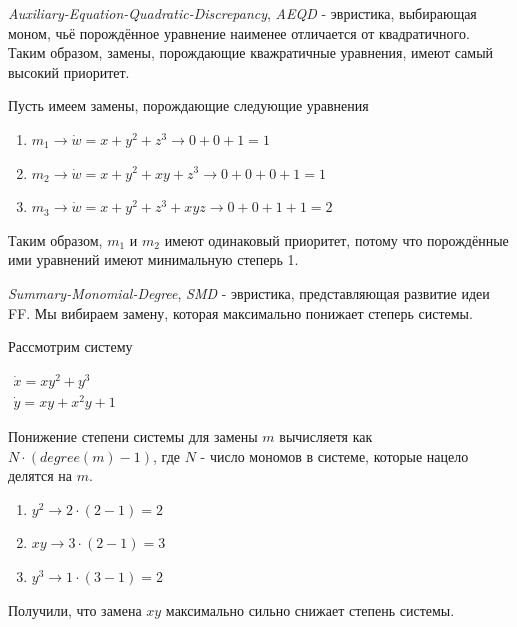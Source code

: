 \begin{heuristics} \label{AEQD}
    \textit{Auxiliary-Equation-Quadratic-Discrepancy}, \textit{AEQD} - эвристика, выбирающая моном, чьё порождённое уравнение наименее отличается от квадратичного. Таким образом, замены, порождающие кважратичные уравнения, имеют самый высокий приоритет. 
    
    \begin{example}
        Пусть имеем замены, порождающие следующие уравнения
        \begin{enumerate}
            \item $m_1 \longrightarrow \dot w = x + y^2 + z^3 \longrightarrow 0 + 0 + 1 = 1$
            \item $m_2 \longrightarrow \dot w = x + y^2 + xy + z^3 \longrightarrow 0 + 0 + 0 + 1 = 1$
            \item $m_3 \longrightarrow \dot w = x + y^2 + z^3 + xyz \longrightarrow 0 + 0 +1 + 1 = 2$
        \end{enumerate}
        Таким образом, $m_1$ и $m_2$ имеют одинаковый приоритет, потому что порождённые ими уравнений имеют минимальную степерь 1.
    \end{example}
\end{heuristics}

\begin{heuristics} \label{AEQD}
    \textit{Summary-Monomial-Degree}, \textit{SMD} - эвристика, представляющая развитие идеи FF. Мы вибираем замену, которая максимально понижает степерь системы.
    
    \begin{example}
        Рассмотрим систему
        
        $\begin{array}{lcl}
             \dot x = xy^2 + y^3 \\
             \dot y = xy + x^2 y + 1
        \end{array}$
        \newline
        
        Понижение степени системы для замены $m$ вычисляетя как $N \cdot (degree(m) - 1)$, где $N$ - число мономов в системе, которые нацело делятся на $m$.
        \begin{enumerate}
            \item $y^2 \longrightarrow 2 \cdot (2 - 1) = 2$
            \item $xy \longrightarrow 3 \cdot (2 - 1) = 3$
            \item $y^3 \longrightarrow 1 \cdot (3 - 1) = 2$
        \end{enumerate}
        Получили, что замена $xy$ максимально сильно снижает степень системы.
    \end{example}
\end{heuristics}

